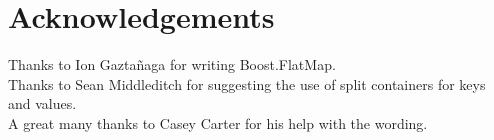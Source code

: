 \section{Acknowledgements}

Thanks to Ion Gazta\~{n}aga for writing Boost.FlatMap.\\

Thanks to Sean Middleditch for suggesting the use of split containers for keys
and values.\\

A great many thanks to Casey Carter for his help with the wording.
